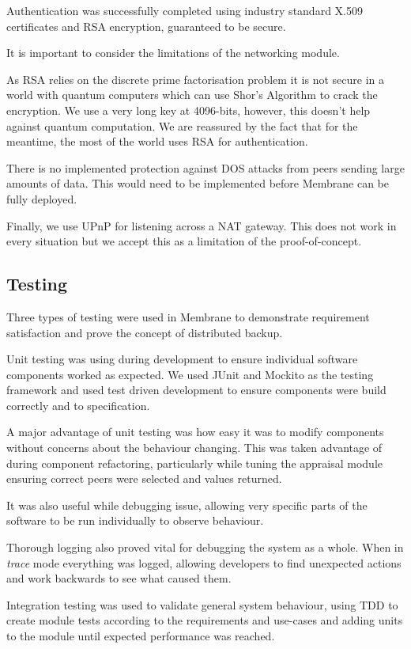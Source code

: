 \documentclass[11pt, a4paper, twocolumn, twoside]{report}
\begin{document}
Authentication was successfully completed using industry standard X.509 certificates and RSA encryption, guaranteed to be secure.

It is important to consider the limitations of the networking module.

As RSA relies on the discrete prime factorisation problem it is not secure in a world with quantum computers which can use Shor's Algorithm to crack the encryption. We use a very long key at 4096-bits, however, this doesn't help against quantum computation. We are reassured by the fact that for the meantime, the most of the world uses RSA for authentication.

There is no implemented protection against DOS attacks from peers sending large amounts of data. This would need to be implemented before Membrane can be fully deployed.

Finally, we use UPnP for listening across a NAT gateway. This does not work in every situation but we accept this as a limitation of the proof-of-concept.

\subsection{Testing}

Three types of testing were used in Membrane to demonstrate requirement satisfaction and prove the concept of distributed backup.

Unit testing was using during development to ensure individual software components worked as expected. We used JUnit and Mockito as the testing framework and used test driven development to ensure components were build correctly and to specification.

A major advantage of unit testing was how easy it was to modify components without concerns about the behaviour changing. This was taken advantage of during component refactoring, particularly while tuning the appraisal module ensuring correct peers were selected and values returned.

It was also useful while debugging issue, allowing very specific parts of the software to be run individually to observe behaviour.

Thorough logging also proved vital for debugging the system as a whole. When in \emph{trace} mode everything was logged, allowing developers to find unexpected actions and work backwards to see what caused them.

Integration testing was used to validate general system behaviour, using TDD to create module tests according to the requirements and use-cases and adding units to the module until expected performance was reached.
\end{document}

